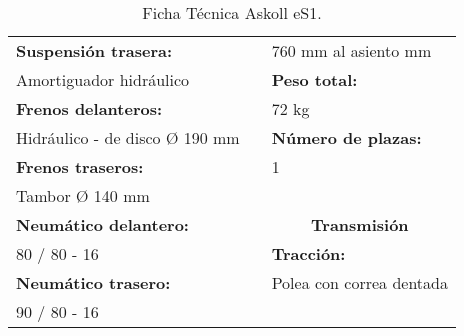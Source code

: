 \begin{table}[H]
\begin{tabular}{lll}
\textbf{Suspensión trasera:}        &  & 760 mm al asiento mm                      \\
Amortiguador hidráulico             &  & \textbf{Peso total:}                      \\
\textbf{Frenos delanteros:}         &  & 72 kg                                     \\
Hidráulico - de disco Ø 190 mm      &  & \textbf{Número de plazas:}                \\
\textbf{Frenos traseros:}           &  & 1                                         \\
Tambor Ø 140 mm                     &  &                                           \\
\textbf{Neumático delantero:}       &  & \multicolumn{1}{c}{\textbf{Transmisión}}  \\ \cline{3-3} 
80 / 80 - 16                        &  & \textbf{Tracción:}                        \\
\textbf{Neumático trasero:}         &  & Polea con correa dentada                  \\
90 / 80 - 16                        &  &                                          
\end{tabular}
\caption{Ficha Técnica Askoll eS1.}
\label{tab: ficha tecnica askoll}
\end{table}